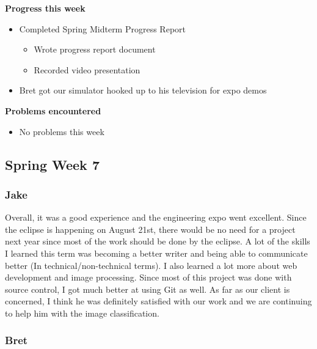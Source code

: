 \documentclass[10pt, onecolumn, draftclsnofoot, letterpaper, compsoc]{IEEEtran}
\begin{document}
    \noindent \textbf{Progress this week}

    \begin{itemize}

    \item Completed Spring Midterm Progress Report
    \begin{itemize}
      \item Wrote progress report document
      \item Recorded video presentation
    \end{itemize}

    \item Bret got our simulator hooked up to his television for expo demos

    \end{itemize}

    \noindent \textbf{Problems encountered}

    \begin{itemize}

    \item No problems this week

    \end{itemize}

\subsection{Spring Week 7}

    \subsubsection{Jake}

    Overall, it was a good experience and the engineering expo went excellent.
    Since the eclipse is happening on August 21st, there would be no need for a
    project next year since most of the work should be done by the eclipse. A lot
    of the skills I learned this term was becoming a better writer and being able
    to communicate better (In technical/non-technical terms). I also learned a
    lot more about web development and image processing. Since most of this project
    was done with source control, I got much better at using Git as well. As far as
    our client is concerned, I think he was definitely satisfied with our work and
    we are continuing to help him with the image classification.

    \subsubsection{Bret}
\end{document}
